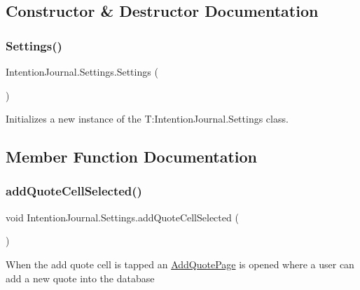 \subsection{Constructor \& Destructor Documentation}
\mbox{\label{class_intention_journal_1_1_settings_a13d2ae82282bf0926f87aa6d029324af}} 
\subsubsection{\texorpdfstring{Settings()}{Settings()}}
{\footnotesize\ttfamily Intention\+Journal.\+Settings.\+Settings (\begin{DoxyParamCaption}{ }\end{DoxyParamCaption})\hspace{0.3cm}{\ttfamily [inline]}}



Initializes a new instance of the T\+:\+Intention\+Journal.\+Settings class. 



\subsection{Member Function Documentation}
\mbox{\label{class_intention_journal_1_1_settings_a32b4275c128513b2bec1f877191cf298}} 
\subsubsection{\texorpdfstring{add\+Quote\+Cell\+Selected()}{addQuoteCellSelected()}}
{\footnotesize\ttfamily void Intention\+Journal.\+Settings.\+add\+Quote\+Cell\+Selected (\begin{DoxyParamCaption}{ }\end{DoxyParamCaption})\hspace{0.3cm}{\ttfamily [inline]}}



When the add quote cell is tapped an \hyperlink{class_intention_journal_1_1_add_quote_page}{Add\+Quote\+Page} is opened where a user can add a new quote into the database 

